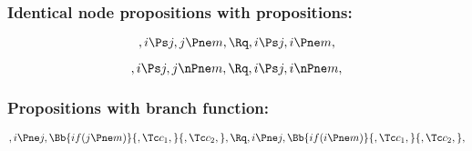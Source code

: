 \bigskip
\bigskip
\bigskip
\bigskip
\subsubsection{Identical node propositions with  propositions:}
\[,i \Ps j, j \Pne m, \Rq , i \Ps j, i \Pne m,\]

\[,i \Ps j, j \nPne m, \Rq , i \Ps j, i \nPne m,\]


\bigskip
\bigskip
\bigskip
\bigskip
\subsubsection{Propositions with branch function:}
\[,i \Pne j, \Bb{if(j \Pne m)}{,\Tc c_1,}{,\Tc c_2,}, \Rq ,i \Pne j, \Bb{if(i \Pne m)}{,\Tc c_1,}{,\Tc c_2,}, \]



